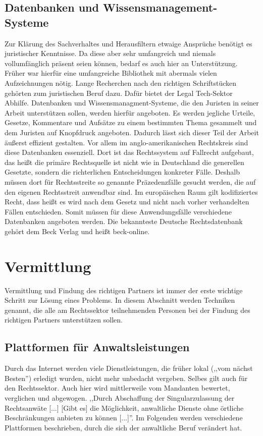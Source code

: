 \subsection{Datenbanken und Wissensmanagement-Systeme}
Zur Klärung des Sachverhaltes und Herausfiltern etwaige Ansprüche benötigt es juristischer Kenntnisse. Da diese aber sehr umfangreich und niemals vollumfänglich präsent seien können, bedarf es auch hier an Unterstützung. Früher war hierfür eine umfangreiche Bibliothek mit abermals vielen Aufzeichnungen nötig. Lange Recherchen nach den richtigen Schriftstücken gehörten zum juristischen Beruf dazu. Dafür bietet der Legal Tech-Sektor Abhilfe. Datenbanken und Wissensmanagment-Systeme, die den Juristen in seiner Arbeit unterstützen sollen, werden hierfür angeboten. Es werden jegliche Urteile, Gesetze, Kommentare und Aufsätze zu einem bestimmten Thema gesammelt und dem Juristen auf Knopfdruck angeboten. Dadurch lässt sich dieser Teil der Arbeit äußerst effizient gestalten. Vor allem im anglo-amerikanischen Rechtskreis sind diese Datenbanken essenziell. Dort ist das Rechtssystem auf Fallrecht aufgebaut, das heißt die primäre Rechtsquelle ist nicht wie in Deutschland die generellen Gesetzte, sondern die richterlichen Entscheidungen konkreter Fälle. Deshalb müssen dort für Rechtsstreite so genannte Präzedenzfälle gesucht werden, die auf den eigenen Rechtsstreit anwendbar sind. Im europäischen Raum gilt kodifiziertes Recht, dass heißt es wird nach dem Gesetz und nicht nach vorher verhandelten Fällen entschieden. Somit müssen für diese Anwendungsfälle verschiedene Datenbanken angeboten werden. Die bekannteste Deutsche Rechtsdatenbank gehört dem Beck Verlag und heißt beck-online.

\section{Vermittlung}
Vermittlung und Findung des richtigen Partners ist immer der erste wichtige Schritt zur Lösung eines Problems.
In diesem Abschnitt werden Techniken genannt, die alle am Rechtssektor teilnehmenden Personen bei der Findung des richtigen Partners unterstützen sollen.
\subsection{Plattformen für Anwaltsleistungen} \label{Plattformen}
Durch das Internet werden viele Dienstleistungen, die früher lokal (,,vom nächst Besten'') erledigt wurden, nicht mehr unbedacht vergeben. Selbes gilt auch für den Rechtssektor. Auch hier wird mittlerweile vom Mandanten bewertet, verglichen und abgewogen. ,,Durch Abschaffung der Singularzulassung der Rechtsanwäte [...] [Gibt es] die Möglichkeit, anwaltliche Dienste ohne örtliche Beschränkungen anbieten zu können [...]''.  Im Folgenden werden verschiedene Plattformen beschrieben, durch die sich der anwaltliche Beruf verändert hat.
